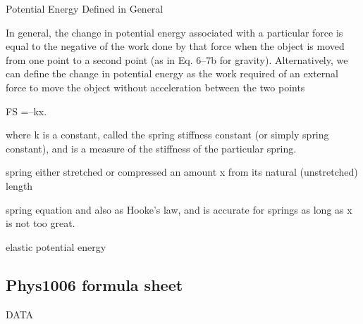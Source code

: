 \documentclass{extarticle}
\begin{document}
\markStart[100]










Potential Energy Defined in General

In general, the change in potential energy
associated with a particular force is equal to the negative of the work done by
that force when the object is moved from one point to a second point (as in Eq. 6–7b
for gravity). Alternatively, we can define the change in potential energy as the
work required of an external force to move the object without acceleration between
the two points


















FS =–kx.

where k is a constant, called the spring stiffness constant (or simply spring constant),
and is a measure of the stiffness of the particular spring.

spring either
stretched or compressed an amount x from its natural (unstretched) length


spring equation and
also as Hooke’s law, and is accurate for springs as long as x is not too great.





elastic potential energy




\markEnd








\subsection{Phys1006 formula sheet}





DATA
\end{document}
